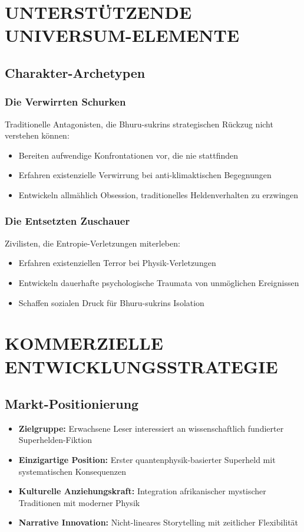 \documentclass[12pt,a4paper]{article}
\begin{document}
\section{UNTERSTÜTZENDE UNIVERSUM-ELEMENTE}

\subsection{Charakter-Archetypen}

\subsubsection{Die Verwirrten Schurken}
Traditionelle Antagonisten, die Bhuru-sukrins strategischen Rückzug nicht verstehen können:
\begin{itemize}
\item Bereiten aufwendige Konfrontationen vor, die nie stattfinden
\item Erfahren existenzielle Verwirrung bei anti-klimaktischen Begegnungen
\item Entwickeln allmählich Obsession, traditionelles Heldenverhalten zu erzwingen
\end{itemize}

\subsubsection{Die Entsetzten Zuschauer}
Zivilisten, die Entropie-Verletzungen miterleben:
\begin{itemize}
\item Erfahren existenziellen Terror bei Physik-Verletzungen
\item Entwickeln dauerhafte psychologische Traumata von unmöglichen Ereignissen
\item Schaffen sozialen Druck für Bhuru-sukrins Isolation
\end{itemize}

\section{KOMMERZIELLE ENTWICKLUNGSSTRATEGIE}

\subsection{Markt-Positionierung}
\begin{itemize}
\item \textbf{Zielgruppe:} Erwachsene Leser interessiert an wissenschaftlich fundierter Superhelden-Fiktion
\item \textbf{Einzigartige Position:} Erster quantenphysik-basierter Superheld mit systematischen Konsequenzen
\item \textbf{Kulturelle Anziehungskraft:} Integration afrikanischer mystischer Traditionen mit moderner Physik
\item \textbf{Narrative Innovation:} Nicht-lineares Storytelling mit zeitlicher Flexibilität
\end{itemize}
\end{document}
